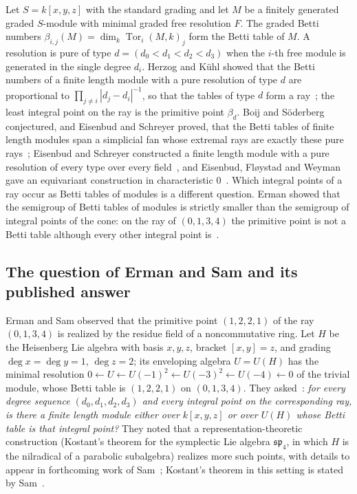 \documentclass[11pt]{article}
\theoremstyle{definition}
\theoremstyle{remark}
\newcommand{\Tor}{\operatorname{Tor}}
\begin{document}
Let $S=k[x,y,z]$ with the standard grading and let $M$ be a finitely generated graded $S$-module with minimal graded free resolution $F$. The graded Betti numbers $\beta_{i,j}(M)=\dim_k\Tor_i(M,k)_j$ form the Betti table of $M$. A resolution is pure of type $d=(d_0<d_1<d_2<d_3)$ when the $i$-th free module is generated in the single degree $d_i$. Herzog and K\"uhl showed that the Betti numbers of a finite length module with a pure resolution of type $d$ are proportional to $\prod_{j\ne i}|d_j-d_i|^{-1}$, so that the tables of type $d$ form a ray~\cite{HK84}; the least integral point on the ray is the primitive point $\beta_d$. Boij and S\"oderberg conjectured, and Eisenbud and Schreyer proved, that the Betti tables of finite length modules span a simplicial fan whose extremal rays are exactly these pure rays~\cite{BS08,ES09}; Eisenbud and Schreyer constructed a finite length module with a pure resolution of every type over every field~\cite[Theorem~5.1]{ES09}, and Eisenbud, Fl{\o}ystad and Weyman gave an equivariant construction in characteristic $0$~\cite{EFW11}. Which integral points of a ray occur as Betti tables of modules is a different question. Erman showed that the semigroup of Betti tables of modules is strictly smaller than the semigroup of integral points of the cone: on the ray of $(0,1,3,4)$ the primitive point is not a Betti table although every other integral point is~\cite[Theorem~1.6(1) and its proof]{Erman09}.

\subsection{The question of Erman and Sam and its published answer}

Erman and Sam observed that the primitive point $(1,2,2,1)$ of the ray $(0,1,3,4)$ is realized by the residue field of a noncommutative ring. Let $H$ be the Heisenberg Lie algebra with basis $x,y,z$, bracket $[x,y]=z$, and grading $\deg x=\deg y=1$, $\deg z=2$; its enveloping algebra $U=U(H)$ has the minimal resolution $0\leftarrow U\leftarrow U(-1)^2\leftarrow U(-3)^2\leftarrow U(-4)\leftarrow 0$ of the trivial module, whose Betti table is $(1,2,2,1)$ on $(0,1,3,4)$. They asked~\cite[Question~6.1]{ES16}: \emph{for every degree sequence $(d_0,d_1,d_2,d_3)$ and every integral point on the corresponding ray, is there a finite length module either over $k[x,y,z]$ or over $U(H)$ whose Betti table is that integral point?} They noted that a representation-theoretic construction (Kostant's theorem for the symplectic Lie algebra $\mathfrak{sp}_4$, in which $H$ is the nilradical of a parabolic subalgebra) realizes more such points, with details to appear in forthcoming work of Sam~\cite[Section~6]{ES16}; Kostant's theorem in this setting is stated by Sam~\cite[Theorem~2.1]{Sam15}.
\end{document}
